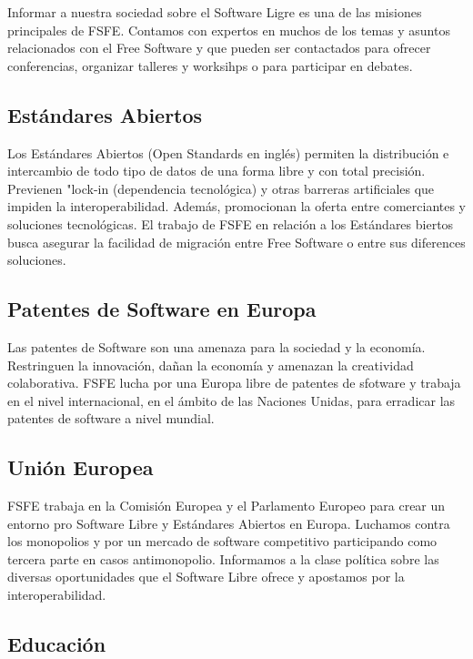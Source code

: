 \documentclass[10pt,foldmark,tumble]{leaflet}
\begin{document}
    Informar a nuestra sociedad sobre el Software Ligre es una de las misiones principales de FSFE. Contamos con expertos en muchos de los temas y asuntos relacionados con el Free Software y que pueden ser contactados para ofrecer conferencias, organizar talleres y worksihps o para participar en debates.
    
\subsection{Estándares Abiertos}

    Los Estándares Abiertos (Open Standards en inglés) permiten la distribución e intercambio de todo tipo de datos de una forma libre y con total precisión. Previenen "lock-in (dependencia tecnológica) y otras barreras artificiales que impiden la interoperabilidad. Además, promocionan la oferta entre comerciantes y soluciones tecnológicas. El trabajo de FSFE en relación a los Estándares biertos busca asegurar la facilidad de migración entre Free Software o entre sus diferences soluciones.
    
\subsection{Patentes de Software en Europa}

    Las patentes de Software son una amenaza para la sociedad y la economía. Restringuen la innovación, dañan la economía y amenazan la creatividad colaborativa. FSFE lucha por una Europa libre de patentes de sfotware y trabaja en el nivel internacional, en el ámbito de las Naciones Unidas, para erradicar las patentes de software a nivel mundial.

\subsection{Unión Europea}

    FSFE trabaja en la Comisión Europea y el Parlamento Europeo para crear un entorno pro Software Libre y Estándares Abiertos en Europa. Luchamos contra los monopolios y por un mercado de software competitivo participando como tercera parte en casos antimonopolio. Informamos a la clase política sobre las diversas oportunidades que el Software Libre ofrece y apostamos por la interoperabilidad.

\subsection{Educación}
\end{document}
